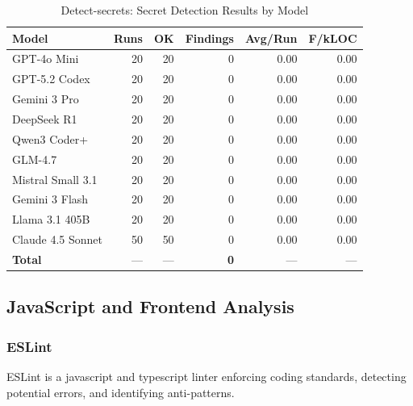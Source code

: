 \begin{table}[htbp]
    \centering
    \caption{Detect-secrets: Secret Detection Results by Model}
    \label{tab:tool_detectsecrets}
    \small
    \begin{tabular}{@{} l r r r r r @{}}
        \toprule
        \textbf{Model} & \textbf{Runs} & \textbf{OK} & \textbf{Findings} & \textbf{Avg/Run} & \textbf{F/kLOC} \\
        \midrule
        GPT-4o Mini & 20 & 20 & 0 & 0.00 & 0.00 \\
        GPT-5.2 Codex & 20 & 20 & 0 & 0.00 & 0.00 \\
        Gemini 3 Pro & 20 & 20 & 0 & 0.00 & 0.00 \\
        DeepSeek R1 & 20 & 20 & 0 & 0.00 & 0.00 \\
        Qwen3 Coder+ & 20 & 20 & 0 & 0.00 & 0.00 \\
        GLM-4.7 & 20 & 20 & 0 & 0.00 & 0.00 \\
        Mistral Small 3.1 & 20 & 20 & 0 & 0.00 & 0.00 \\
        Gemini 3 Flash & 20 & 20 & 0 & 0.00 & 0.00 \\
        Llama 3.1 405B & 20 & 20 & 0 & 0.00 & 0.00 \\
        Claude 4.5 Sonnet & 50 & 50 & 0 & 0.00 & 0.00 \\
        \midrule
        \textbf{Total} & --- & --- & \textbf{0} & --- & --- \\
        \bottomrule
    \end{tabular}
\end{table}

\subsection{JavaScript and Frontend Analysis}

\subsubsection{ESLint}

ESLint is a javascript and typescript linter enforcing coding standards, detecting potential errors, and identifying anti-patterns.

